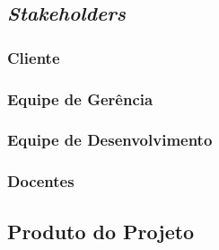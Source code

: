 		\subsection[\textit{Stakeholders}]{\textit{Stakeholders}}

			\subsubsection[Cliente]{Cliente}
			
			\subsubsection[Equipe de Gerência]{Equipe de Gerência}

			\subsubsection[Equipe de Desenvolvimento]{Equipe de Desenvolvimento}

			\subsubsection[Docentes]{Docentes}

		\subsection[Produto do Projeto]{Produto do Projeto}


